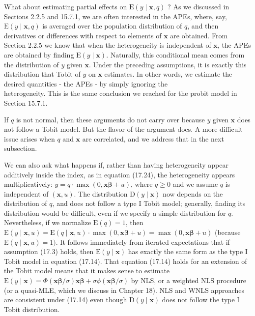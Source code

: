 \documentclass[10pt]{article}
\begin{document}
What about estimating partial effects on $\mathrm{E}(y \mid \mathbf{x}, q)$ ? As we discussed in Sections 2.2.5 and 15.7.1, we are often interested in the APEs, where, say, $\mathrm{E}(y \mid \mathbf{x}, q)$ is averaged over the population distribution of $q$, and then derivatives or differences with respect to elements of $\mathbf{x}$ are obtained. From Section 2.2.5 we know that when the heterogeneity is independent of $\mathbf{x}$, the APEs are obtained by finding $\mathrm{E}(y \mid \mathbf{x})$. Naturally, this conditional mean comes from the distribution of $y$ given $\mathbf{x}$. Under the preceding assumptions, it is exactly this distribution that Tobit of $y$ on $\mathbf{x}$ estimates. In other words, we estimate the desired quantities - the APEs - by simply ignoring the\\
heterogeneity. This is the same conclusion we reached for the probit model in Section 15.7.1.

If $q$ is not normal, then these arguments do not carry over because $y$ given $\mathbf{x}$ does not follow a Tobit model. But the flavor of the argument does. A more difficult issue arises when $q$ and $\mathbf{x}$ are correlated, and we address that in the next subsection.

We can also ask what happens if, rather than having heterogeneity appear additively inside the index, as in equation (17.24), the heterogeneity appears multiplicatively: $y=q \cdot \max (0, \mathbf{x} \boldsymbol{\beta}+u)$, where $q \geq 0$ and we assume $q$ is independent of $(\mathbf{x}, u)$. The distribution $\mathrm{D}(y \mid \mathbf{x})$ now depends on the distribution of $q$, and does not follow a type I Tobit model; generally, finding its distribution would be difficult, even if we specify a simple distribution for $q$. Nevertheless, if we normalize $\mathrm{E}(q)=1$, then $\mathrm{E}(y \mid \mathbf{x}, u)=\mathrm{E}(q \mid \mathbf{x}, u) \cdot \max (0, \mathbf{x} \boldsymbol{\beta}+u)=\max (0, \mathbf{x} \boldsymbol{\beta}+u)$ (because $\mathrm{E}(q \mid \mathbf{x}, u)=1)$. It follows immediately from iterated expectations that if assumption (17.3) holds, then $\mathrm{E}(y \mid \mathbf{x})$ has exactly the same form as the type I Tobit model in equation (17.14). That equation (17.14) holds for an extension of the Tobit model means that it makes sense to estimate $\mathrm{E}(y \mid \mathbf{x})=\Phi(\mathbf{x} \boldsymbol{\beta} / \sigma) \mathbf{x} \boldsymbol{\beta}+\sigma \phi(\mathbf{x} \boldsymbol{\beta} / \sigma)$ by NLS, or a weighted NLS procedure (or a quasi-MLE, which we discuss in Chapter 18). NLS and WNLS approaches are consistent under (17.14) even though $\mathrm{D}(y \mid \mathbf{x})$ does not follow the type I Tobit distribution.
\end{document}
